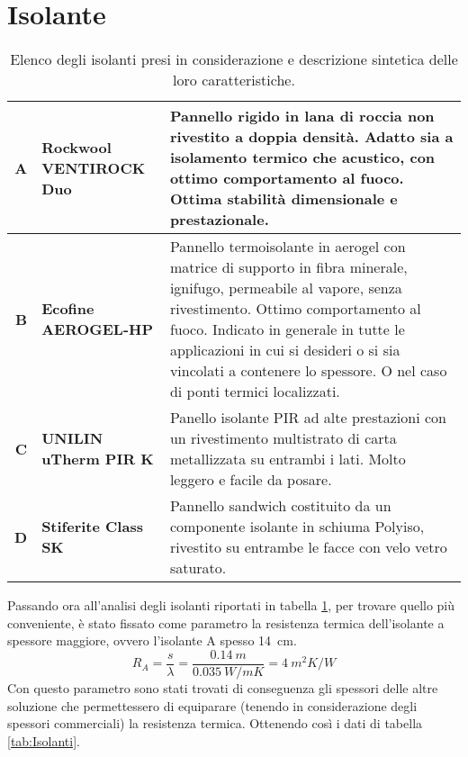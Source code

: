 \section{Isolante}
\begin{table}[htbp]
\caption{Elenco degli isolanti presi in considerazione e descrizione sintetica delle loro caratteristiche.}
\label{MaterialiISO}
\centering
\begin{tabularx}{\textwidth}{rXX}
    \toprule
        \textbf{A} & \textbf{Rockwool VENTIROCK Duo} & Pannello rigido in lana di roccia non rivestito a doppia densità. 
        Adatto sia a isolamento termico che acustico, con ottimo comportamento al fuoco. 
        Ottima stabilità dimensionale e prestazionale. \\\midrule
        \textbf{B} & \textbf{Ecofine AEROGEL-HP} & Pannello termoisolante in aerogel con matrice di supporto in fibra minerale, ignifugo, permeabile al vapore, senza rivestimento. 
        Ottimo comportamento al fuoco. 
        Indicato in generale in tutte le applicazioni in cui si desideri o si sia vincolati a contenere lo spessore. O nel caso di ponti termici localizzati.\\\midrule
        \textbf{C} & \textbf{UNILIN uTherm PIR K} & Panello isolante PIR ad alte prestazioni con un rivestimento multistrato di carta metallizzata su entrambi i lati. 
        Molto leggero e facile da posare.\\\midrule
        \textbf{D} & \textbf{Stiferite Class SK} & Pannello sandwich costituito da un componente isolante in schiuma Polyiso, rivestito su entrambe le facce con velo vetro saturato.\\
    \bottomrule
\end{tabularx}
\end{table}
Passando ora all'analisi degli isolanti riportati in tabella \ref{MaterialiISO}, per trovare quello più conveniente, è stato fissato come parametro la resistenza termica dell'isolante a spessore maggiore, ovvero l'isolante A spesso \SI{14}{\centi\metre}.
\[R_A = \frac{s}{\lambda}=\frac{\SI{0.14}{m}}{\SI{0.035}{W/mK}}=\SI{4}{m^2K\per W}\]
Con questo parametro sono stati trovati di conseguenza gli spessori delle altre soluzione che permettessero di equiparare (tenendo in considerazione degli spessori commerciali) la resistenza termica. 
Ottenendo così i dati di tabella \ref{tab:Isolanti}.

